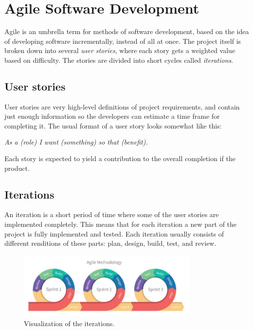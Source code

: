     
\section{Agile Software Development} \label{Agile}
\vspace{-5mm}
Agile is an umbrella term for methods of software development, based on the idea of developing software incrementally, instead of all at once. The project itself is broken down into several \textit{user stories}, where each story gets a weighted value based on difficulty. The stories are divided into short cycles called \textit{iterations}.\cite{agile:nutshell}

\subsection{User stories}
\vspace{-5mm}
User stories are very high-level definitions of project requirements, and contain just enough information so the developers can estimate a time frame for completing it. The usual format of a user story looks somewhat like this:
\vspace{-5mm}
\begin{center}
	\textit{As a (role) I want (something) so that (benefit).}
\end{center}
\vspace{-5mm}
Each story is expected to yield a contribution to the overall completion if the product.\cite{agile:modeling}

\pagebreak
\subsection{Iterations}\vspace{-5mm}
An iteration is a short period of time where some of the user stories are implemented completely. This means that for each iteration a new part of the project is fully implemented and tested. Each iteration usually consists of different renditions of these parts: plan, design, build, test, and review. 
\begin{figure}[H]
	\centering
	\includegraphics[trim={0 0 0 0},clip,width=0.8\textwidth]{Files/agile.jpg}
	\caption{Visualization of the iterations\cite{agile:figure}.}
	\label{fig: MVC}
\end{figure}

